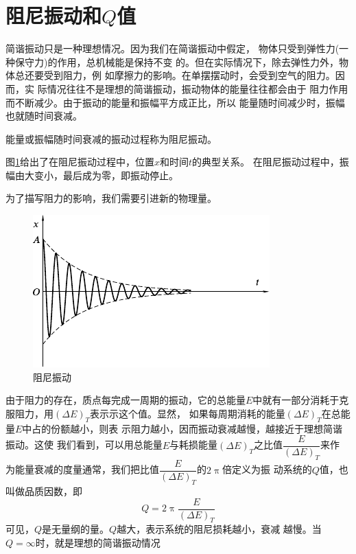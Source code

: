 \section{阻尼振动和$ Q $值}\label{sec:07.04}

简谐振动只是一种理想情况。因为我们在简谐振动中假定，
物体只受到弹性力(一种保守力)的作用，总机械能是保持不变
的。但在实际情况下，除去弹性力外，物体总还要受到阻力，例
如摩擦力的影响。在单摆摆动时，会受到空气的阻力。因而，实
际情况往往不是理想的简谐振动，振动物体的能量往往都会由于
阻力作用而不断减少。由于振动的能量和振幅平方成正比，所以
能量随时间减少时，振幅也就随时间衰减。

能量或振幅随时间衰减的振动过程称为阻尼振动。

图\ref{fig:07.08}给出了在阻尼振动过程中，位置$ x $和时间$ t $的典型关系。
在阻尼振动过程中，振幅由大变小，最后成为零，即振动停止。

为了描写阻力的影响，我们需要引进新的物理量。



\begin{figure}[t]
  \centering
  \includegraphics{figure/fig07.08}

  \caption{阻尼振动}
  \label{fig:07.08}
\end{figure}


由于阻力的存在，质点每完成一周期的振动，它的总能量$ E $中就有一部分消耗于克服阻力，用$ \left( \Delta E \right) _ { T } $表示示这个值。显然，
如果每周期消耗的能量$ \left( \Delta E \right) _ { T } $在总能量$ E $中占的份额越小，则表
示阻力越小，因而振动衰减越慢，越接近于理想简谐振动。这使
我们看到，可以用总能量$ E $与耗损能量$ \left( \Delta E \right) _ { T } $之比值$ \dfrac { E } { \left( \Delta E \right) _ { T } } $来作
为能量衰减的度量通常，我们把比值$ \dfrac { E } { \left( \Delta E \right) _ { T } } $的$ 2 \uppi $倍定义为振
动系统的$ Q $值，也叫做品质因数，即
\begin{equation}\label{eqn:07.04.01}
  Q = 2 \uppi \frac { E } { \left( \Delta E \right) _ { T } }
\end{equation}
可见，$ Q $是无量纲的量。$ Q $越大，表示系统的阻尼损耗越小，衰减
越慢。当$ Q = \infty $时，就是理想的简谐振动情况

